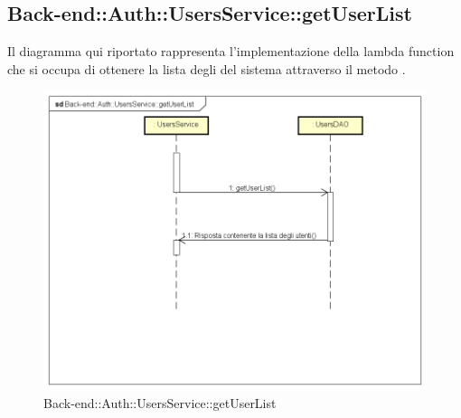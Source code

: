 \subsection{Back-end::Auth::UsersService::getUserList}
Il diagramma qui riportato rappresenta l'implementazione della lambda function che si occupa di ottenere la lista degli  del sistema attraverso il metodo .
\begin{figure}[h] \centering \includegraphics[width=\textwidth,height=\textheight,keepaspectratio]{images/diagrams/back-end/Ufficial_Backend/Back-endAuthUsersServicegetUserList.png} 	\caption{Back-end::Auth::UsersService::getUserList}
\end{figure}
\newpage

